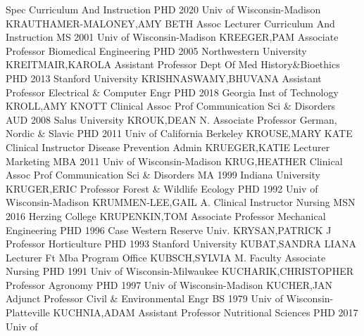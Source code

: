 \documentclass[
]{article}
\begin{document}
Spec \textbar{}  \textbar Curriculum And Instruction
\textbar PHD 2020 Univ of Wisconsin-Madison
\textbar KRAUTHAMER-MALONEY,AMY BETH \textbar Assoc Lecturer \textbar{}
 \textbar Curriculum And Instruction \textbar MS 2001 Univ
of Wisconsin-Madison \textbar KREEGER,PAM \textbar Associate Professor
\textbar{}  \textbar Biomedical Engineering \textbar PHD
2005 Northwestern University \textbar KREITMAIR,KAROLA
\textbar Assistant Professor \textbar{}  \textbar Dept Of
Med History\&Bioethics \textbar PHD 2013 Stanford University
\textbar KRISHNASWAMY,BHUVANA \textbar Assistant Professor \textbar{}
 \textbar Electrical \& Computer Engr \textbar PHD 2018
Georgia Inst of Technology \textbar KROLL,AMY KNOTT \textbar Clinical
Assoc Prof \textbar{}  \textbar Communication Sci \&
Disorders \textbar AUD 2008 Salus University \textbar KROUK,DEAN N.
\textbar Associate Professor \textbar{}  \textbar German,
Nordic \& Slavic \textbar PHD 2011 Univ of California Berkeley
\textbar KROUSE,MARY KATE \textbar Clinical Instructor \textbar{}
 \textbar Disease Prevention Admin \textbar KRUEGER,KATIE
\textbar Lecturer \textbar Marketing \textbar{} 
\textbar MBA 2011 Univ of Wisconsin-Madison \textbar KRUG,HEATHER
\textbar Clinical Assoc Prof \textbar Communication Sci \& Disorders
\textbar{}  \textbar MA 1999 Indiana University
\textbar KRUGER,ERIC \textbar Professor \textbar Forest \& Wildlife
Ecology \textbar{}  \textbar PHD 1992 Univ of
Wisconsin-Madison \textbar KRUMMEN-LEE,GAIL A. \textbar Clinical
Instructor \textbar Nursing \textbar{}  \textbar MSN 2016
Herzing College \textbar KRUPENKIN,TOM \textbar Associate Professor
\textbar Mechanical Engineering \textbar{}  \textbar PHD
1996 Case Western Reserve Univ. \textbar KRYSAN,PATRICK J
\textbar Professor \textbar Horticulture \textbar{} 
\textbar PHD 1993 Stanford University \textbar KUBAT,SANDRA LIANA
\textbar Lecturer \textbar Ft Mba Program Office \textbar{} 
\textbar KUBSCH,SYLVIA M. \textbar Faculty Associate \textbar Nursing
\textbar PHD 1991 Univ of Wisconsin-Milwaukee \textbar{} 
\textbar KUCHARIK,CHRISTOPHER \textbar Professor \textbar Agronomy
\textbar PHD 1997 Univ of Wisconsin-Madison \textbar{} 
\textbar KUCHER,JAN \textbar Adjunct Professor \textbar Civil \&
Environmental Engr \textbar BS 1979 Univ of Wisconsin-Platteville
\textbar{}  \textbar KUCHNIA,ADAM \textbar Assistant
Professor \textbar Nutritional Sciences \textbar PHD 2017 Univ of
\end{document}
